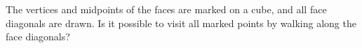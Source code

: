 The vertices and midpoints of the faces are marked on a cube, and all face diagonals are drawn. Is it possible to visit all marked points by walking along the face diagonals?
